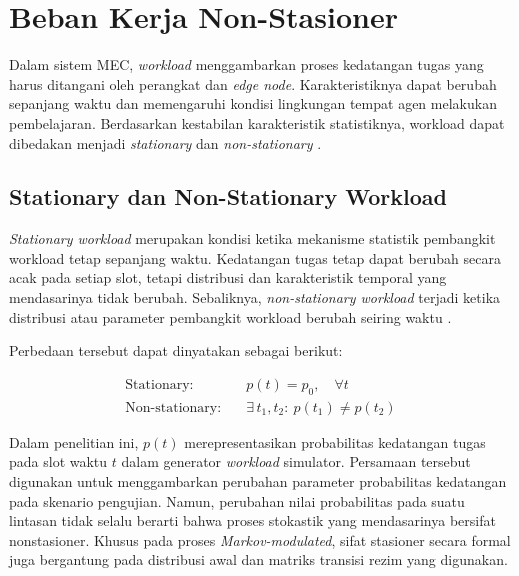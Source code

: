 \vspace{1cm}
\section{Beban Kerja Non-Stasioner}
\label{sec:beban_kerja_non_stasioner}

Dalam sistem MEC, \textit{workload} menggambarkan proses kedatangan tugas yang harus ditangani oleh perangkat dan \textit{edge node}. Karakteristiknya dapat berubah sepanjang waktu dan memengaruhi kondisi lingkungan tempat agen melakukan pembelajaran. Berdasarkan kestabilan karakteristik statistiknya, workload dapat dibedakan menjadi \textit{stationary} dan \textit{non-stationary} \cite{tang2022deep, padakandla2020reinforcement}.

\vspace{1cm}
\subsection{Stationary dan Non-Stationary Workload}
\label{subsec:stationary_dan_non_stationary_workload}

\textit{Stationary workload} merupakan kondisi ketika mekanisme statistik pembangkit workload tetap sepanjang waktu. Kedatangan tugas tetap dapat berubah secara acak pada setiap slot, tetapi distribusi dan karakteristik temporal yang mendasarinya tidak berubah. Sebaliknya, \textit{non-stationary workload} terjadi ketika distribusi atau parameter pembangkit workload berubah seiring waktu \cite{padakandla2020reinforcement, khetarpal2022towards}.

Perbedaan tersebut dapat dinyatakan sebagai berikut:

\begin{equation}
\label{eq:stationary_vs_nonstationary}
\begin{aligned}
\text{Stationary:}\quad
&p(t)=p_0,\quad \forall t\\
\text{Non-stationary:}\quad
&\exists\,t_1,t_2:\ p(t_1)\neq p(t_2)
\end{aligned}
\end{equation}

Dalam penelitian ini, $p(t)$ merepresentasikan probabilitas kedatangan tugas pada slot waktu $t$ dalam generator \textit{workload} simulator. Persamaan tersebut digunakan untuk menggambarkan perubahan parameter probabilitas kedatangan pada skenario pengujian. Namun, perubahan nilai probabilitas pada suatu lintasan tidak selalu berarti bahwa proses stokastik yang mendasarinya bersifat nonstasioner. Khusus pada proses \textit{Markov-modulated}, sifat stasioner secara formal juga bergantung pada distribusi awal dan matriks transisi rezim yang digunakan.

